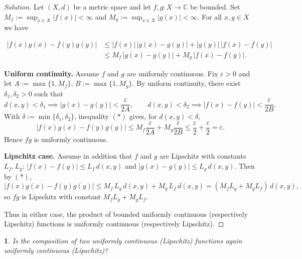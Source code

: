 \documentclass[12pt, a4paper]{report}
\theoremstyle{spaced}
\newtheorem{exercise}{}
\newcommand{\setexercise}[1]{\setcounter{exercise}{#1-1}}
\begin{document}
\begin{proof}[Solution]
	Let $(X,d)$ be a metric space and let $f,g:X\to\mathbb{C}$ be bounded.
	Set $M_f:=\sup_{x\in X}|f(x)|<\infty$ and $M_g:=\sup_{x\in X}|g(x)|<\infty$.
	For all $x,y\in X$ we have

	\begin{align}
		|f(x)g(x)-f(y)g(y)|
		 & \le |f(x)|\,|g(x)-g(y)| + |g(y)|\,|f(x)-f(y)| \nonumber \\
		 & \le M_f\,|g(x)-g(y)| + M_g\,|f(x)-f(y)|.
		\tag{$*$}
	\end{align}



	\medskip
	\textbf{Uniform continuity.}
	Assume $f$ and $g$ are uniformly continuous. Fix $\varepsilon>0$ and let
	$A:=\max\{1,M_f\}$, $B:=\max\{1,M_g\}$.
	By uniform continuity, there exist $\delta_1,\delta_2>0$ such that
	\[
		d(x,y)<\delta_1 \implies |g(x)-g(y)|<\frac{\varepsilon}{2A},
		\qquad
		d(x,y)<\delta_2 \implies |f(x)-f(y)|<\frac{\varepsilon}{2B}.
	\]
	With $\delta:=\min\{\delta_1,\delta_2\}$, inequality $(*)$ gives, for $d(x,y)<\delta$,
	\[
		|f(x)g(x)-f(y)g(y)|
		\le M_f\frac{\varepsilon}{2A}+M_g\frac{\varepsilon}{2B}
		\le \frac{\varepsilon}{2}+\frac{\varepsilon}{2}=\varepsilon.
	\]
	Hence $fg$ is uniformly continuous.

	\medskip
	\textbf{Lipschitz case.}
	Assume in addition that $f$ and $g$ are Lipschitz with constants $L_f,L_g$:
	$|f(x)-f(y)|\le L_f\,d(x,y)$ and $|g(x)-g(y)|\le L_g\,d(x,y)$.
	Then by $(*)$,
	\[
		|f(x)g(x)-f(y)g(y)|
		\le M_f\,L_g\,d(x,y) + M_g\,L_f\,d(x,y)
		= (M_fL_g+M_gL_f)\,d(x,y),
	\]
	so $fg$ is Lipschitz with constant $M_fL_g+M_gL_f$.

	Thus in either case, the product of bounded uniformly continuous (respectively Lipschitz)
	functions is uniformly continuous (respectively Lipschitz).
\end{proof}

\setexercise{4}
\begin{exercise}
	Is the composition of two uniformly continuous (Lipschitz) functions again uniformly continuous (Lipschitz)?
\end{exercise}
\end{document}
